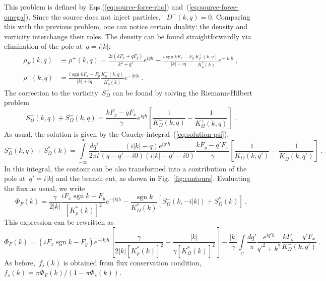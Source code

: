 \documentclass[preprint,aps,eqsecnum, prb]{revtex4-1}
\newcommand{\fplus}[1]{{#1}^{+}}
\newcommand{\fminus}[1]{{#1}^{-}}
\newcommand{\sgn}{\mathop{\mathrm{sgn}}\nolimits}
\begin{document}
This problem is defined by Eqs.(\ref{eq:source-force-rho})
and~(\ref{eq:source-force-omega}). Since the source does not inject particles,
~$\fplus{D}(k, q) = 0$. Comparing this with the previous problem,
one can notice certain duality: the density and vorticity interchange their
roles. The density can be found straightforwardly via elimination of the pole
at~$q = i|k|$:
\begin{align}
  \rho_F(k, q) &\equiv \fplus{\rho}(k, q) = \frac{2i(k F_x + q F_y)}{k^2 + q^2}
  e^{iqh} - \frac{i\sgn k F_x - F_y}{|k| + i q}
   \frac{\fplus{K}_\rho(k, q)}{K_\rho^\ast(k)} e^{-|k|h}
  \ ,
  \\
  \fminus{\rho}(k, q) &= \frac{i\sgn k F_x - F_y}{|k| + iq}
   \frac{\fminus{K}_\rho(k, q)}{K_\rho^\ast(k)} e^{-|k|h}
  \ .
\end{align}
The correction to the vorticity~$\fminus{S}_\Omega$ can be found
 by solving the Riemann-Hilbert problem
\begin{equation}
  \fplus{S}_\Omega(k, q) + \fminus{S}_\Omega(k, q) =
  \frac{k F_y - qF_x}{\gamma} e^{iqh} \left[\frac{1}{\fminus{K}_\Omega(k, q)}
   - \frac{1}{\fplus{K}_\Omega(k, q)} \right]
  \ .
\end{equation}
 As usual, the solution is given
by the Cauchy integral~(\ref{eq:solution-psi}):
\begin{equation}
  \fminus{S}_\Omega(k, q) + S_\Omega^\ast(k) =  \int\limits_{-\infty}^{\infty}
  \frac{dq'}{2\pi i}
  \frac{(i|k| - q) e^{iq'h}}{(q - q' - i0)(i|k| - q' - i0)}
  \frac{k F_y - q'F_x}{\gamma}
  \left[\frac{1}{\fminus{K}_\Omega(k, q')}
            - \frac{1}{\fplus{K}_\Omega(k, q')}\right]
  \ .
\end{equation}
In this integral, the contour can be also transformed into a contribution of
the pole at~$q' = i |k|$ and the branch cut, as shown in Fig.~\ref{fig:contours}.
Evaluating the flux as usual, we write
\begin{equation}
  \Phi_F(k) = \frac{\gamma}{2|k|}\frac{i F_x \sgn k - F_y}{\left[K_\rho^\ast(k)\right]^2}
  e^{-|k| h} - \frac{\sgn k}{K_\Omega^\ast(k)}
  \left[\fminus{S}_\Omega(k, -i|k|) + S_\Omega^\ast(k)\right]
  \ .
\end{equation}
This expression can be rewritten as
\begin{equation}
  \Phi_F(k) =  (i F_x \sgn k - F_y)e^{-|k|h}
  \left[\frac{\gamma}{2|k|\left[K_\rho^\ast(k)\right]^2} - \frac{|k|}{\gamma\left[K_\Omega^\ast(k)\right]^2 }\right]
  -  \frac{|k|}{\gamma}\int\limits_C \frac{dq'}{\pi} \frac{e^{iq'h}}{q'^2 + k^2}
     \frac{k F_y - q'F_x}{\fminus{K}_\Omega(k, q')}
     \ .
\end{equation}
As before,~$f_s(k)$ is obtained from flux conservation condition,
$f_s(k) = \pi \Phi_F(k)/(1 - \pi \Phi_s(k))$.
\end{document}
